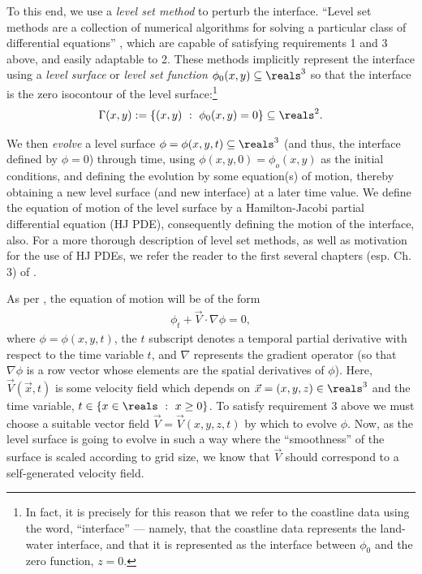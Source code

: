 \documentclass{article}
\begin{document}
To this end, we use a \emph{level set method} to perturb the
interface. ``Level set methods are a collection of numerical
algorithms for solving a particular class of differential
equations'' \cite{mitchell}, which are capable of satisfying
requirements 1 and 3 above, and easily adaptable to 2. These
methods implicitly represent the interface using a \emph{level
  surface} or \emph{level set function} $\phi_0(x,y)\subseteq
\reals^3$ so that the interface is the zero isocontour of the
level surface:\footnote{In fact, it is precisely for this reason that we refer to the
coastline data using the word, ``interface'' --- namely, that the
coastline data represents the land-water interface, and that it is
represented as the interface between $\phi_0$ and the zero function,
$z = 0$.}
\begin{align*}
  \Gamma (x, y) := \left\{(x,y)~:~ \phi_0(x,y) = 0\right\}
  \subseteq \reals^2.
\end{align*}

We then \emph{evolve} a level surface $\phi = \phi(x,y,t)
\subseteq \reals^3$ (and thus, the interface defined by $\phi =
0$) through time, using $\phi(x,y,0) = \phi_o(x,y)$ as the initial
conditions, and defining the evolution by some equation(s) of
motion, thereby obtaining a new level surface (and new interface)
at a later time value. We define the equation of motion of the
level surface by a Hamilton-Jacobi partial differential equation
(HJ PDE), consequently defining the motion of the interface,
also. For a more thorough description of level set methods, as
well as motivation for the use of HJ PDEs, we refer the reader to
the first several chapters (esp. Ch. 3) of \cite{osher2003}.

As per \cite{osher2003}, the equation of motion will be of the
form 
\begin{align}
\label{eq:genl-lvl-set}
  \phi_t + \vec{V}\cdot \nabla \phi = 0,
\end{align}
where $\phi = \phi(x,y,t)$, the $t$ subscript denotes a temporal
partial derivative with respect to the time variable $t$, and
$\nabla$ represents the gradient operator (so that $\nabla \phi$
is a row vector whose elements are the spatial derivatives of
$\phi$).  Here, $\vec{V}(\vec{x}, t)$ is some velocity field which
depends on $\vec{x} = (x,y,z) \in \reals^3$ and the time variable,
$t\in \{x\in\reals~:~ x\geq 0\}$. To satisfy requirement 3 above
we must choose a suitable vector field $\vec{V} =
\vec{V}(x,y,z,t)$ by which to evolve $\phi$. Now, as the level
surface is going to evolve in such a way where the ``smoothness''
of the surface is scaled according to grid size, we know that
$\vec{V}$ should correspond to a self-generated velocity field.
\end{document}

